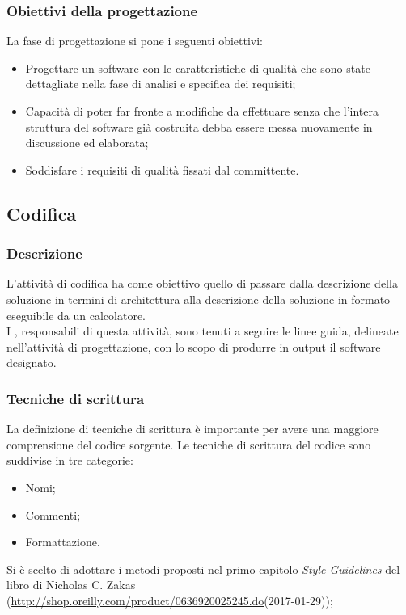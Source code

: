 \documentclass[../NormeDiProgetto.tex]{subfiles}
\begin{document}
            \subsubsection{Obiettivi della progettazione}
            La fase di progettazione si pone i seguenti obiettivi:
            \begin{itemize}
                  \item Progettare un software con le caratteristiche di qualità che sono state dettagliate nella fase di analisi e specifica dei requisiti;
                  \item Capacità di poter far fronte a modifiche da effettuare senza che l'intera struttura del software già costruita debba essere messa nuovamente in discussione ed elaborata;
                  \item Soddisfare i requisiti di qualità fissati dal committente.
            \end{itemize}

      \subsection{Codifica}
            \subsubsection{Descrizione}
            L'attività di codifica ha come obiettivo quello di passare dalla descrizione della soluzione in termini di architettura alla descrizione della soluzione in formato eseguibile da un calcolatore. \\ I \programmatori, responsabili di questa attività, sono tenuti a seguire le linee guida, delineate nell'attività di progettazione, con lo scopo di produrre in output il software designato.

            \subsubsection{Tecniche di scrittura}
            La definizione di tecniche di scrittura è importante per avere una maggiore comprensione del codice sorgente. Le tecniche di scrittura del codice sono suddivise in tre categorie:
            \begin{itemize}
                  \item Nomi;
                  \item Commenti;
                  \item Formattazione.
            \end{itemize}
            Si è scelto di adottare i metodi proposti nel primo capitolo \textit{Style Guidelines} del libro  di Nicholas C. Zakas (\url{http://shop.oreilly.com/product/0636920025245.do}(2017-01-29));
            
\end{document}
